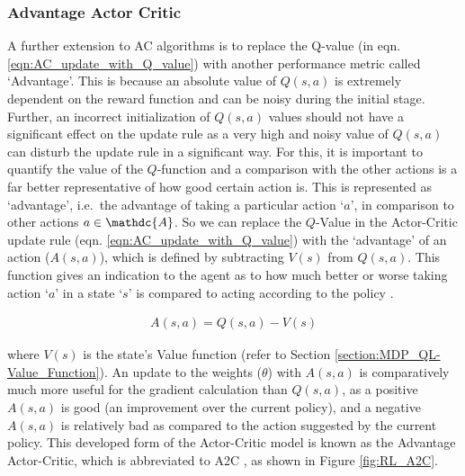 \subsubsection{Advantage Actor Critic}
A further extension to AC algorithms is to replace the Q-value (in eqn. \ref{eqn:AC_update_with_Q_value}) with another performance metric called `Advantage'. This is because an absolute value of $Q(s,a)$ is extremely dependent on the reward function and can be noisy during the initial stage. Further, an incorrect initialization of $Q(s,a)$ values should not have a significant effect on the update rule as a very high and noisy value of $Q(s,a)$ can disturb the update rule in a significant way. For this, it is important to quantify the value of the $Q$-function and a comparison with the other actions is a far better representative of how good certain action is. This is represented as `advantage', i.e.\ the advantage of taking a particular action `$a$', in comparison to other actions $a \in \mathdc{A}$. So we can replace the $Q$-Value in the Actor-Critic update rule (eqn. \ref{eqn:AC_update_with_Q_value}) with the `advantage' of an action ($A(s, a)$), which is defined by subtracting $V(s)$ from $Q(s,a)$. This function gives an indication to the agent as to how much better or worse taking action `$a$' in a state `$s$' is compared to acting according to the policy \parencite{mnih2016asynchronous}. 

\begin{align}
    A(s, a) = Q(s,a) - V(s) \label{eqn:AC_Advantage}
\end{align}

where $V(s)$ is the state’s Value function (refer to Section \ref{section:MDP_QL-Value_Function}). An update to the weights ($\theta$) with $A(s,a)$ is comparatively much more useful for the gradient calculation than $Q(s,a)$, as a positive $A(s,a)$ is good (an improvement over the current policy), and a negative $A(s,a)$ is relatively bad as compared to the action suggested by the current policy. This developed form of the Actor-Critic model is known as the Advantage Actor-Critic, which is abbreviated to A2C \parencite{mnih2016asynchronous}, as shown in Figure \ref{fig:RL_A2C}.

